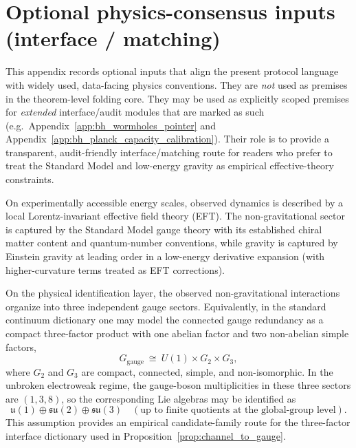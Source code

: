 \section{Optional physics-consensus inputs (interface / matching)}
\label{app:physics_consensus_inputs}

\AuditTag This appendix records optional inputs that align the present protocol language with widely used, data-facing physics conventions.
They are \emph{not} used as premises in the theorem-level folding core.
They may be used as explicitly scoped premises for \emph{extended} interface/audit modules that are marked as such (e.g.\ Appendix~\ref{app:bh_wormholes_pointer} and Appendix~\ref{app:bh_planck_capacity_calibration}).
Their role is to provide a transparent, audit-friendly interface/matching route for readers who prefer to treat the Standard Model and low-energy gravity as empirical effective-theory constraints.

\begin{assumption}
\label{ass:consensus_sm_gr_eft}
\MatchTag On experimentally accessible energy scales, observed dynamics is described by a local Lorentz-invariant effective field theory (EFT).
The non-gravitational sector is captured by the Standard Model gauge theory with its established chiral matter content and quantum-number conventions, while gravity is captured by Einstein gravity at leading order in a low-energy derivative expansion (with higher-curvature terms treated as EFT corrections).
\end{assumption}

\begin{assumption}
\label{ass:consensus_three_factor_gauge}
\MatchTag On the physical identification layer, the observed non-gravitational interactions organize into three independent gauge sectors.
Equivalently, in the standard continuum dictionary one may model the connected gauge redundancy as a compact three-factor product with one abelian factor and two non-abelian simple factors,
\[
G_{\mathrm{gauge}}\ \cong\ U(1)\times G_2\times G_3,
\]
where $G_2$ and $G_3$ are compact, connected, simple, and non-isomorphic.
In the unbroken electroweak regime, the gauge-boson multiplicities in these three sectors are $(1,3,8)$, so the corresponding Lie algebras may be identified as
\[
\mathfrak{u}(1)\oplus \mathfrak{su}(2)\oplus \mathfrak{su}(3)
\quad (\text{up to finite quotients at the global-group level}).
\]
This assumption provides an empirical candidate-family route for the three-factor interface dictionary used in Proposition~\ref{prop:channel_to_gauge}.
\end{assumption}


